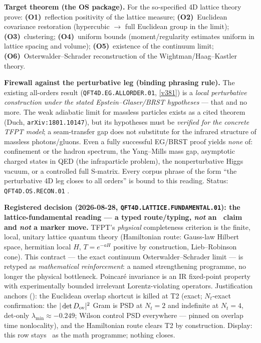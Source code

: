 \par\smallskip\noindent\textbf{Target theorem (the OS package).}  For the so-specified 4D
lattice theory prove: \textbf{(O1)}~reflection positivity of the lattice measure;
\textbf{(O2)}~Euclidean covariance restoration (hypercubic $\to$ full Euclidean group in the
limit); \textbf{(O3)}~clustering; \textbf{(O4)}~uniform bounds (moment/regularity estimates
uniform in lattice spacing and volume); \textbf{(O5)}~existence of the continuum limit;
\textbf{(O6)}~Osterwalder--Schrader reconstruction of the Wightman/Haag--Kastler theory.

\par\smallskip\noindent\textbf{Firewall against the perturbative leg (binding phrasing rule).}
The existing all-orders result (\texttt{QFT4D.EG.ALLORDER.01}, \vref{v381}) is a \emph{local
perturbative construction under the stated Epstein--Glaser/BRST hypotheses} --- that and no
more.  The weak adiabatic limit for massless particles exists as a cited theorem (Duch,
\texttt{arXiv:1801.10147}), but its hypotheses must be \emph{verified for the concrete TFPT
model}; a seam-transfer gap does not substitute for the infrared structure of massless
photons/gluons.  Even a fully successful EG/BRST proof yields \emph{none} of: confinement or the
hadron spectrum, the Yang--Mills mass gap, asymptotic charged states in QED (the infraparticle
problem), the nonperturbative Higgs vacuum, or a controlled full S-matrix.  Every corpus phrase
of the form ``the perturbative 4D leg closes to all orders'' is bound to this reading.
Status: \texttt{QFT4D.OS.RECON.01} \mO.

\par\smallskip\noindent\textbf{Registered decision (2026-08-28,
\texttt{QFT4D.LATTICE.FUNDAMENTAL.01}): the lattice-fundamental reading --- a typed
route/typing, \emph{not} an \mE\ claim and \emph{not} a marker move.}
TFPT's \emph{physical} completeness criterion is the finite, local, unitary lattice quantum
theory (Hamiltonian route: Gauss-law Hilbert space, hermitian local $H$, $T=e^{-aH}$ positive
by construction, Lieb--Robinson cone).  This contract --- the exact continuum
Osterwalder--Schrader limit --- is retyped as \emph{mathematical reinforcement}: a named
strengthening programme, no longer the physical bottleneck.  Poincar\'e invariance is an IR
fixed-point property with experimentally bounded irrelevant Lorentz-violating operators.
Justification anchors ():
the Euclidean overlap shortcut is killed at T2 (exact; $N_t$-exact confirmation: the
$|\det D_{\rm ov}|^2$ Gram is PSD at $N_t=2$ and indefinite at $N_t=4$, det-only
$\lambda_{\min}\approx-0.249$; Wilson control PSD everywhere --- pinned on overlap time
nonlocality), and the Hamiltonian route clears T2 by construction.  Display: this row stays
\mO\ as the math programme; nothing closes.

